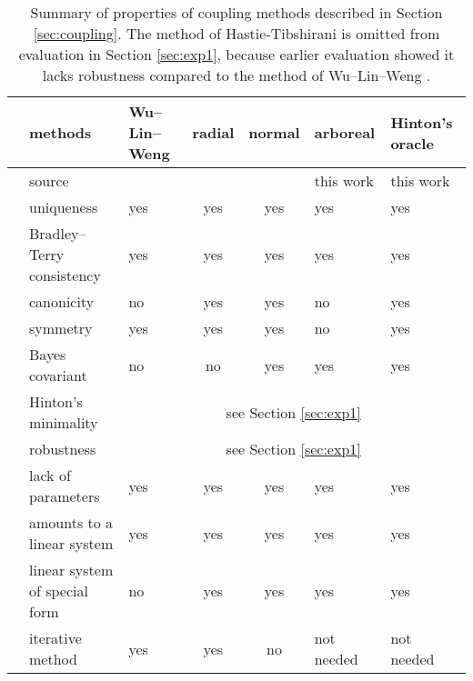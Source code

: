 \begin{table}[!ht]
	\begin{tabular}{cm{2.5cm}|m{1.5cm}ccm{1.5cm}|m{1.5cm}}
		\hline 
		&methods %
			& Wu--Lin--Weng & radial & normal & arboreal & Hinton's oracle \\
		\hline 
		&source %
			& \cite{wu2004probability} & \cite{vsuch2015new} & \cite{vsuch2016bayes} & this work & this work \\
		\multirow{5}{*}{\begin{turn}{90}\makecell{exact}\end{turn}}
		&uniqueness %
			& yes & yes & yes & yes & yes \\
		&Bradley--Terry consistency %
			& yes & yes & yes & yes & yes \\
		&canonicity %
			& no & yes & yes & no & yes \\
		&symmetry %
			& yes & yes & yes & no & yes \\
		& Bayes covariant %
			& no & no & yes & yes & yes \\
		\hline
		\multirow{5}{*}{\begin{turn}{90}\makecell{non-exact}\end{turn}}
		&Hinton's minimality %
			& \multicolumn{5}{c}{see Section \ref{sec:exp1}} \\
		&robustness %
			& \multicolumn{5}{c}{see Section \ref{sec:exp1}} \\
		&lack of parameters %
			& yes & yes & yes & yes & yes \\
		& amounts to a linear system %
			& yes & yes & yes & yes & yes\\
		& linear system of special form %
			& no & yes & yes & yes & yes \\
		& iterative method %
			& yes & yes & no & not needed & not needed\\
		\hline
	\end{tabular}
	\caption{Summary of properties of coupling methods described in Section \ref{sec:coupling}. The method of Hastie-Tibshirani is omitted from evaluation in Section \ref{sec:exp1}, because earlier evaluation showed it lacks robustness compared to the method of Wu--Lin--Weng \cite{wu2004probability}.}
	\label{tab:summaryCoupling}
\end{table}


